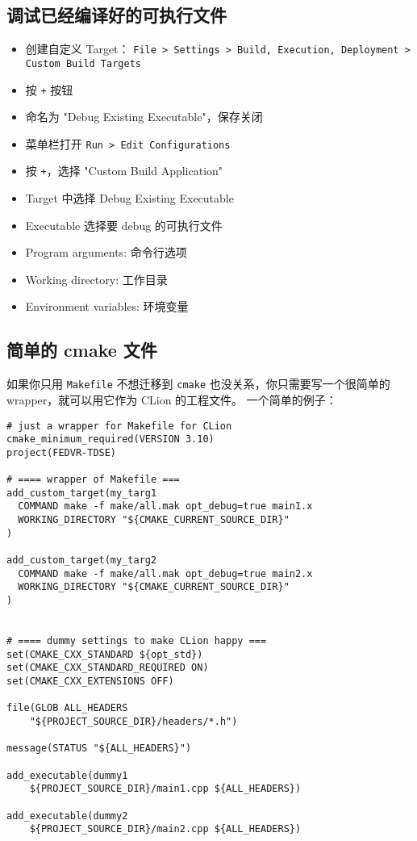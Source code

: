 \subsection{调试已经编译好的可执行文件}\label{sub_CLionN_1}
\begin{itemize}
\item 创建自定义 Target： \verb`File > Settings > Build, Execution, Deployment > Custom Build Targets`
\item 按 \verb`+` 按钮
\item 命名为 "Debug Existing Executable"，保存关闭
\item 菜单栏打开 \verb`Run > Edit Configurations`
\item 按 \verb`+`，选择 "Custom Build Application"
\item Target 中选择 Debug Existing Executable
\item Executable 选择要 debug 的可执行文件
\item Program arguments: 命令行选项
\item Working directory: 工作目录
\item Environment variables: 环境变量
\end{itemize}

\subsection{简单的 cmake 文件}
如果你只用 \verb`Makefile` 不想迁移到 \verb`cmake` 也没关系，你只需要写一个很简单的 wrapper，就可以用它作为 CLion 的工程文件。 一个简单的例子：
\begin{lstlisting}[language=none]
# just a wrapper for Makefile for CLion
cmake_minimum_required(VERSION 3.10)
project(FEDVR-TDSE)

# ==== wrapper of Makefile ===
add_custom_target(my_targ1
  COMMAND make -f make/all.mak opt_debug=true main1.x
  WORKING_DIRECTORY "${CMAKE_CURRENT_SOURCE_DIR}"
)

add_custom_target(my_targ2
  COMMAND make -f make/all.mak opt_debug=true main2.x
  WORKING_DIRECTORY "${CMAKE_CURRENT_SOURCE_DIR}"
)


# ==== dummy settings to make CLion happy ===
set(CMAKE_CXX_STANDARD ${opt_std})
set(CMAKE_CXX_STANDARD_REQUIRED ON)
set(CMAKE_CXX_EXTENSIONS OFF)

file(GLOB ALL_HEADERS
    "${PROJECT_SOURCE_DIR}/headers/*.h")

message(STATUS "${ALL_HEADERS}")

add_executable(dummy1
    ${PROJECT_SOURCE_DIR}/main1.cpp ${ALL_HEADERS})

add_executable(dummy2
    ${PROJECT_SOURCE_DIR}/main2.cpp ${ALL_HEADERS})
\end{lstlisting}

